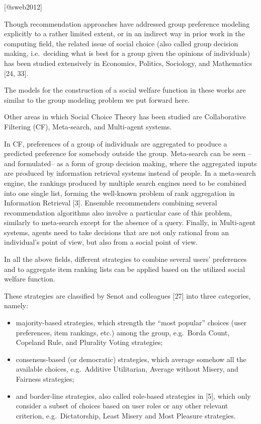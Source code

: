 \documentclass[]{article}
\begin{document}
{[}@sweb2012{]}

Though recommendation approaches have addressed group preference
modeling explicitly to a rather limited extent, or in an indirect way in
prior work in the computing field, the related issue of social choice
(also called group decision making, i.e.~deciding what is best for a
group given the opinions of individuals) has been studied extensively in
Economics, Politics, Sociology, and Mathematics {[}24, 33{]}.

The models for the construction of a social welfare function in these
works are similar to the group modeling problem we put forward here.

Other areas in which Social Choice Theory has been studied are
Collaborative Filtering (CF), Meta-search, and Multi-agent systems.

In CF, preferences of a group of individuals are aggregated to produce a
predicted preference for somebody outside the group. Meta-search can be
seen --and formulated-- as a form of group decision making, where the
aggregated inputs are produced by information retrieval systems instead
of people. In a meta-search engine, the rankings produced by multiple
search engines need to be combined into one single list, forming the
well-known problem of rank aggregation in Information Retrieval {[}3{]}.
Ensemble recommenders combining several recommendation algorithms also
involve a particular case of this problem, similarly to meta-search
except for the absence of a query. Finally, in Multi-agent systems,
agents need to take decisions that are not only rational from an
individual's point of view, but also from a social point of view.

In all the above fields, different strategies to combine several users'
preferences and to aggregate item ranking lists can be applied based on
the utilized social welfare function.

These strategies are classified by Senot and colleagues {[}27{]} into
three categories, namely:

\begin{itemize}
\item
  majority-based strategies, which strength the ``most popular'' choices
  (user preferences, item rankings, etc.) among the group, e.g.~Borda
  Count, Copeland Rule, and Plurality Voting strategies;
\item
  consensus-based (or democratic) strategies, which average somehow all
  the available choices, e.g.~Additive Utilitarian, Average without
  Misery, and Fairness strategies;
\item
  and border-line strategies, also called role-based strategies in
  {[}5{]}, which only consider a subset of choices based on user roles
  or any other relevant criterion, e.g.~Dictatorship, Least Misery and
  Most Pleasure strategies.
\end{itemize}
\end{document}
